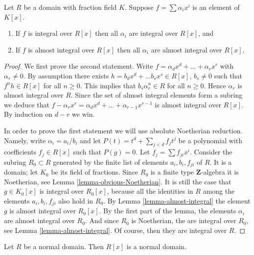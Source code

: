 \begin{lemma}
\label{lemma-prepare-polynomial-ring-normal}
Let $R$ be a domain with fraction field $K$.
Suppose $f = \sum \alpha_i x^i$ is an
element of $K[x]$.
\begin{enumerate}
\item If $f$ is integral over $R[x]$
then all $\alpha_i$ are integral over $R[x]$, and
\item If $f$ is almost integral over $R[x]$
then all $\alpha_i$ are almost integral over $R[x]$.
\end{enumerate}
\end{lemma}

\begin{proof}
We first prove the second statement.
Write $f = \alpha_d x^d + \ldots + \alpha_r x^r$
with $\alpha_r \not = 0$. 
By assumption there exists $h = b_d x^d + \ldots b_s x^s \in R[x]$,
$b_s \not= 0$ such that $f^n h \in R[x]$ for all
$n \geq 0$. This implies that $b_s \alpha_r^n \in R$
for all $n \geq 0$. Hence $\alpha_r$ is almost
integral over $R$. Since the set of almost integral
elements form a subring we deduce that
$f - \alpha_r x^r = \alpha_d x^d + \ldots + \alpha_{r-1} x^{r-1}$
is almost integral over $R[x]$. By induction on $d-r$ we win.

\medskip\noindent
In order to prove the first statement we will use absolute Noetherian
reduction. Namely, write $\alpha_i = a_i / b_i$ and
let $P(t) = t^d + \sum_{j < d} f_j t^j$ be a polynomial
with coefficients $f_j \in R[x]$ such that $P(g) = 0$.
Let $f_j = \sum f_{ji}x^i$. Consider the subring
$R_0 \subset R$ generated by the finite list of elements
$a_i, b_i, f_{ji}$ of $R$. It is a domain; let
$K_0$ be its field of fractions. Since $R_0$ is a finite type
$\mathbf{Z}$-algebra it is Noetherian, see
Lemma \ref{lemma-obvious-Noetherian}. It is still
the case that $g \in K_0[x]$ is integral over $R_0[x]$,
because all the identities in $R$
among the elements $a_i, b_i, f_{ji}$ also hold in $R_0$.
By Lemma \ref{lemma-almost-integral} the element
$g$ is almost integral over $R_0[x]$. By the first part of
the lemma, the elements $\alpha_i$ are almost integral
over $R_0$. And since $R_0$ is Noetherian, the are
integral over $R_0$, see Lemma \ref{lemma-almost-integral}.
Of course, then they are integral over $R$.
\end{proof}

\begin{lemma}
\label{lemma-polynomial-ring-normal}
Let $R$ be a normal domain.
Then $R[x]$ is a normal domain.
\end{lemma}

